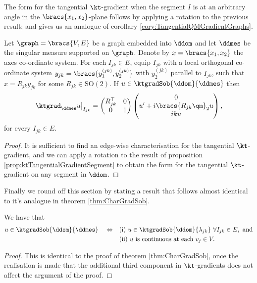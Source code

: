 The form for the tangential $\kt$-gradient when the segment $I$ is at an arbitrary angle in the $\bracs{x_1,x_2}$-plane follows by applying a rotation to the previous result; and gives us an analogue of corollary \ref{cory:TangentialQMGradientGraphs}.
\begin{cory} \label{cory:ktTangentialGradientForm}
	Let $\graph=\bracs{V,E}$ be a graph embedded into $\ddom$ and let $\ddmes$ be the singular measure supported on $\graph$.
	Denote by $x=\bracs{x_1,x_2}$ the axes co-ordinate system.
	For each $I_{jk}\in E$, equip $I_{jk}$ with a local orthogonal co-ordinate system $y_{jk}=\bracs{y^{(jk)}_1,y^{(jk)}_2}$ with $y^{(jk)}_2$ parallel to $I_{jk}$, such that $x=R_{jk}y_{jk}$ for some $R_{jk}\in\mathrm{SO}(2)$.
	If $u\in\ktgradSob{\ddom}{\ddmes}$ then
	\begin{align*}
		\left.\ktgrad_{\ddmes}u\right\vert_{I_{jk}} = \begin{pmatrix} R_{jk}^\top & 0 \\ 0 & 1 \end{pmatrix} \begin{pmatrix} 0 \\ u' + i\bracs{R_{jk}\qm}_2 u \\ iku \end{pmatrix},
	\end{align*}
	for every $I_{jk}\in E$.
\end{cory}
\begin{proof}
	It is sufficient to find an edge-wise characterisation for the tangential $\kt$-gradient, and we can apply a rotation to the result of proposition \ref{prop:ktTangentialGradientSegment} to obtain the form for the tangential $\kt$-gradient on any segment in $\ddom$.
\end{proof}

Finally we round off this section by stating a result that follows almost identical to it's analogue in theorem \ref{thm:CharGradSob}.
\begin{theorem} \label{thm:ktGradSobChar}
	We have that
	\begin{align*}
		u\in\ktgradSob{\ddom}{\ddmes} \quad \Leftrightarrow 
		&\quad\text{(i)} \ u\in\ktgradSob{\ddom}{\lambda_{jk}} \ \forall I_{jk}\in E, \text{ and}\\
		&\quad\text{(ii)} \ u \text{ is continuous at each } v_j\in V.
	\end{align*}
\end{theorem}
\begin{proof}
	This is identical to the proof of theorem \ref{thm:CharGradSob}, once the realisation is made that the additional third component in $\kt$-gradients does not affect the argument of the proof.
\end{proof}

